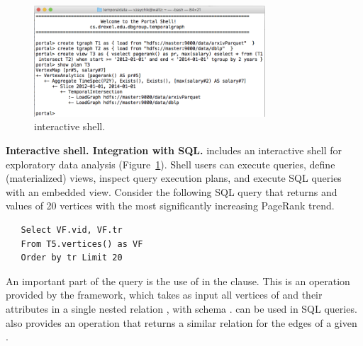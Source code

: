 
\begin{figure}[t]
\centering
\includegraphics[width=3.4in]{figs/shell.png}
\vspace{-0.5cm}
\caption{\sys interactive shell.}
\vspace{-0.5cm}
\label{fig:shell}
\end{figure}

{\bf Interactive shell. Integration with SQL.}  \sys includes an
interactive shell for exploratory data analysis
(Figure~\ref{fig:shell}). Shell users can execute queries, define
(materialized) views, inspect query execution plans, and execute SQL
queries with an embedded \ql view. Consider the following SQL query
that returns  and  values of 20 vertices with the
most significantly increasing PageRank trend.

\begin{small}
\begin{verbatim}
   Select VF.vid, VF.tr
   From T5.vertices() as VF
   Order by tr Limit 20
\end{verbatim}
\vspace{-0.1cm}
\end{small}

An important part of the query is the use of  in
the  clause. This is an operation provided by the \sys
framework, which takes as input all vertices of  and their
attributes in a single nested relation , with schema
.  can be
used in SQL queries. \sys also provides an operation 
that returns a similar relation for the edges of a given \tg.



